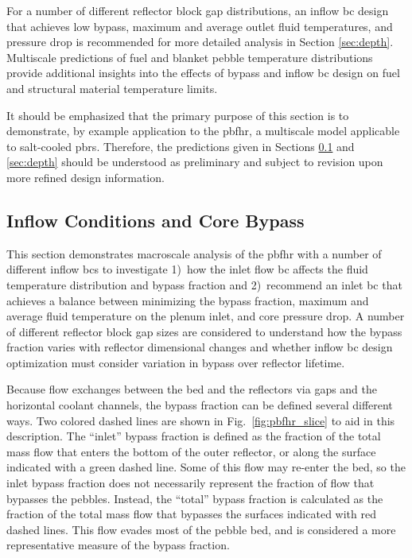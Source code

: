 For a number of different reflector block gap distributions, an inflow \gls{bc} design that achieves low bypass, maximum and average outlet fluid temperatures, and pressure drop is recommended for more detailed analysis in Section \ref{sec:depth}. Multiscale predictions of fuel and blanket pebble temperature distributions provide additional insights into the effects of bypass and inflow \gls{bc} design on fuel and structural material temperature limits.

It should be emphasized that the primary purpose of this section is to demonstrate, by example application to the \gls{pbfhr}, a multiscale model applicable to salt-cooled \glspl{pbr}. Therefore, the predictions given in Sections \ref{sec:inflow} and \ref{sec:depth} should be understood as preliminary and subject to revision upon more refined design information. 

\subsection{Inflow Conditions and Core Bypass}
\label{sec:inflow}

This section demonstrates macroscale analysis of the \gls{pbfhr} with a number of different inflow \glspl{bc} to investigate 1)~how the inlet flow \gls{bc} affects the fluid temperature distribution and bypass fraction and 2)~recommend an inlet \gls{bc} that achieves a balance between minimizing the bypass fraction, maximum and average fluid temperature on the plenum inlet, and core pressure drop. A number of different reflector block gap sizes are considered to understand how the bypass fraction varies with reflector dimensional changes and whether inflow \gls{bc} design optimization must consider variation in bypass over reflector lifetime.

Because flow exchanges between the bed and the reflectors via gaps and the horizontal coolant channels, the bypass fraction can be defined several different ways. Two colored dashed lines are shown in Fig.\ \ref{fig:pbfhr_slice} to aid in this description. The ``inlet'' bypass fraction is defined as the fraction of the total mass flow that enters the bottom of the outer reflector, or along the surface indicated with a green dashed line. Some of this flow may re-enter the bed, so the inlet bypass fraction does not necessarily represent the fraction of flow that bypasses the pebbles. Instead, the ``total'' bypass fraction is calculated as the fraction of the total mass flow that bypasses the surfaces indicated with red dashed lines. This flow evades most of the pebble bed, and is considered a more representative measure of the bypass fraction.

